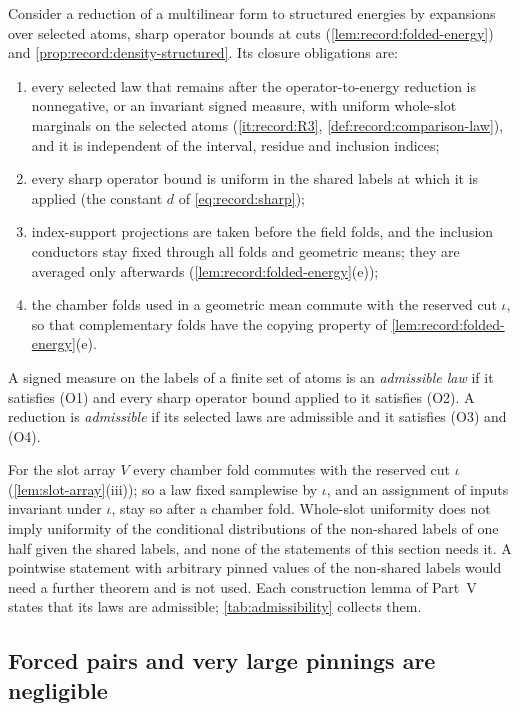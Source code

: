 \begin{definition}\label{def:admissible}
Consider a reduction of a multilinear form to structured energies by
expansions over selected atoms, sharp operator bounds at cuts
(\cref{lem:record:folded-energy}) and \cref{prop:record:density-structured}.
Its closure obligations are:
\begin{enumerate}[label=(O\arabic*)]
\item every selected law that remains after the operator-to-energy reduction
 is nonnegative, or an invariant signed measure, with uniform whole-slot
 marginals on the selected atoms (\ref{it:record:R3},
 \cref{def:record:comparison-law}), and it is independent of the interval,
 residue and inclusion indices;
\item every sharp operator bound is uniform in the shared labels at which it
 is applied (the constant $d$ of \eqref{eq:record:sharp});
\item index-support projections are taken before the field folds, and the
 inclusion conductors stay fixed through all folds and geometric means; they
 are averaged only afterwards (\cref{lem:record:folded-energy}(e));
\item the chamber folds used in a geometric mean commute with the reserved
 cut $\iota$, so that complementary folds have the
 copying property of \cref{lem:record:folded-energy}(e).
\end{enumerate}
A signed measure on the labels of a finite set of atoms is an
\emph{admissible law} if it satisfies (O1) and every sharp operator bound
applied to it satisfies (O2). A reduction is \emph{admissible} if its selected
laws are admissible and it satisfies (O3) and (O4).
\end{definition}

For the slot array $V$ every chamber fold commutes with the reserved cut
$\iota$ (\cref{lem:slot-array}(iii)); so a law fixed samplewise by $\iota$,
and an assignment of inputs invariant under $\iota$, stay so after a chamber
fold. Whole-slot uniformity does not imply uniformity of the conditional
distributions of the non-shared labels of one half given the shared labels,
and none of the statements of this section needs it. A pointwise statement
with arbitrary pinned values of the non-shared labels would need a further
theorem and is not used. Each construction lemma of Part~V states that its
laws are admissible; \cref{tab:admissibility} collects them.

\subsection{Forced pairs and very large pinnings are negligible}\label{subsec:scale:cancellation}

